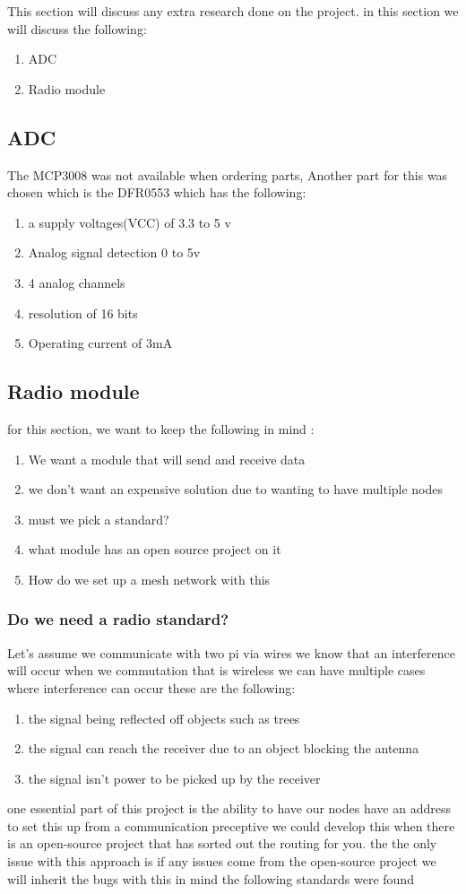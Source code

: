 This section will discuss any extra research done on the project.
in this section we will discuss the following:
\begin{enumerate}
    \item ADC
    \item Radio module
\end{enumerate}
\subsection{ADC}
The MCP3008 was not  available when ordering parts, Another  part for this was chosen which is the  DFR0553 which has the following:
\begin{enumerate}
    \item a supply voltages(VCC) of 3.3 to 5 v
    \item Analog signal  detection 0 to 5v
    \item 4 analog channels
    \item resolution of 16 bits
    \item Operating current of 3mA
\end{enumerate}
\subsection{Radio module}
for  this  section, we want  to keep  the following in mind :
\begin{enumerate}
    \item We want a module that will send  and receive data
    \item we don't  want  an  expensive solution due  to wanting to  have  multiple nodes
    \item must we pick a standard? 
    \item what module has  an open source project on it 
    \item How do we  set up  a   mesh network with this 
\end{enumerate}
\subsubsection{Do we need a radio standard?}
Let's assume we communicate with two pi via wires  we know that an interference will occur when  we  commutation that is wireless
we can have multiple cases where interference can  occur these are  the following:
\begin{enumerate}
    \item the signal being reflected off objects such as  trees
    \item the signal can reach the  receiver due to an object blocking the antenna
    \item the signal isn't  power to be picked up by the receiver
\end{enumerate}
one essential part of this project is the  ability to have  our nodes have an address to set this up
from a communication preceptive we could develop this when there is an open-source project that has sorted out the routing for you.
the the only issue with this approach is if any issues come from the open-source project we will inherit the bugs
with this in mind the following standards were found

